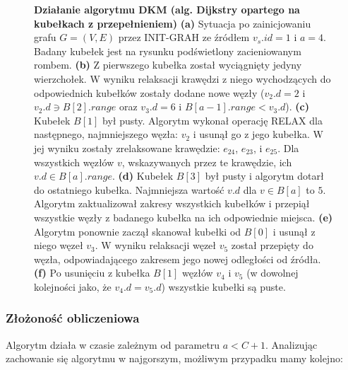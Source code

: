 \begin{figure}[!htbp]
\begin{subfigure}[b]{0.32\textwidth}
		\caption{}
	\end{subfigure}
	\caption{\textbf{Działanie algorytmu DKM (alg. Dijkstry opartego na kubełkach z przepełnieniem)} \textbf{(a)}  Sytuacja po zainicjowaniu grafu $G = \left( V, E \right)$ przez \textsf{INIT-GRAH} ze źródłem $v_{s}.id = 1$ i $a = 4$. Badany kubełek jest na rysunku podświetlony zacieniowanym rombem. \textbf{(b)} Z pierwszego kubełka został wyciągnięty jedyny wierzchołek. W wyniku relaksacji krawędzi z niego wychodzących do odpowiednich kubełków zostały dodane nowe węzły ($v_{2}.d = 2$ i $ v_{2}.d \ni B \left[ 2 \right].range$ oraz $v_{3}.d = 6$ i $ B \left[ a - 1 \right].range < v_{3}.d $). \textbf{(c)} Kubełek $B \left[ 1 \right]$ był pusty. Algorytm wykonał operację \textsf{RELAX} dla następnego, najmniejszego węzła: $v_{2}$ i usunął go z jego kubełka. W jej wyniku zostały zrelaksowane krawędzie: $e_{24}$, $e_{23}$, i $e_{25}$. Dla wszystkich węzłów $v$, wskazywanych przez te krawędzie, ich $v.d \in B \left[ a \right].range$. \textbf{(d)} Kubełek $B \left[ 3 \right]$ był pusty i algorytm dotarł do ostatniego kubełka. Najmniejsza wartość $v.d$ dla $v \in B \left[ a \right]$ to $5$. Algorytm zaktualizował zakresy wszystkich kubełków i przepiął wszystkie węzły z badanego kubełka na ich odpowiednie miejsca. \textbf{(e)} Algorytm ponownie zaczął skanował kubełki od $B \left[ 0 \right]$ i usunął z niego węzeł $v_{3}$. W wyniku relaksacji węzeł $v_{5}$ został przepięty do węzła, odpowiadającego zakresem jego nowej odległości od źródła. \textbf{(f)} Po usunięciu z kubełka $B \left[ 1 \right]$ węzłów $v_{4}$ i $v_{5}$ (w dowolnej kolejności jako, że $v_{4}.d = v_{5}.d$) wszystkie kubełki są puste. } \label{fig:exampleOverflowBucket}
\end{figure}

\subsubsection{Złożoność obliczeniowa}

Algorytm działa w czasie zależnym od parametru $a < C + 1$. Analizując zachowanie się algorytmu w najgorszym, możliwym przypadku mamy kolejno:

